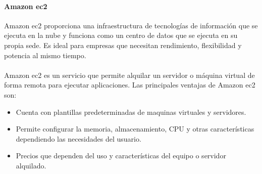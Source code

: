 \documentclass[12pt, a4paper, titlepage]{report}
\begin{document}

		   	\paragraph{Amazon \acrshort{ec2} \\}
		   	Amazon \acrfull{ec2} \cite{amazon_ec2} proporciona una infraestructura de tecnologías de información que se ejecuta en la nube y funciona como un centro de datos que se ejecuta en su propia sede. Es ideal para empresas que necesitan rendimiento, flexibilidad y potencia al mismo tiempo.\\\\
		   	Amazon \acrshort{ec2} es un servicio que permite alquilar un servidor o máquina virtual de forma remota para ejecutar aplicaciones.	
		   	Las principales ventajas de Amazon \acrshort{ec2} son: 
		   	\begin{itemize}
		   		\item Cuenta con plantillas predeterminadas de maquinas virtuales y servidores.
		   		\item Permite configurar la memoria, almacenamiento, CPU y otras características dependiendo las necesidades del usuario.
		   		\item Precios que dependen del uso y características del equipo o servidor alquilado.
		   	\end{itemize}
		   	
\end{document}

